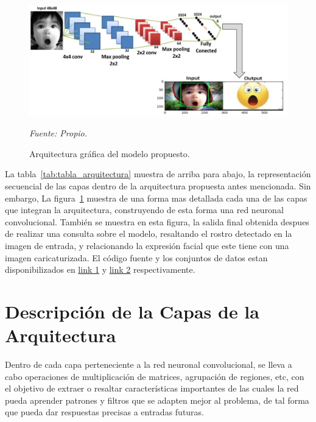 \begin{figure}[H]
		\centering
		\includegraphics[width=180mm]{Imagenes/arquitectura_CNN_grafico.pdf}
		\caption{Arquitectura gráfica del modelo propuesto.}
		\vspace{0.15cm}
		\textit{Fuente: Propio.}
		\label{fig:arquitectura_CNN_grafico}
\end{figure}

La tabla~\ref{tab:tabla_arquitectura} muestra de arriba para abajo, la representación secuencial de las capas dentro de la arquitectura propuesta antes mencionada. Sin embargo, La figura~\ref{fig:arquitectura_CNN_grafico} muestra de una forma mas detallada cada una de las capas que integran la arquitectura, construyendo de esta forma una red neuronal convolucional. También se muestra en esta figura, la salida final obtenida despues de realizar una consulta sobre el modelo, resaltando el rostro detectado en la imagen de entrada, y relacionando la expresión facial que este tiene con una imagen caricaturizada. El código fuente y los conjuntos de datos estan disponibilizados en
\href{https://github.com/darwinTC/Facial-Expression-Recognition/tree/master/report/Sources}{link 1} y \href{https://drive.google.com/drive/folders/1vMJIC8TW1NX7ffMbyZPraySLGV6hnGK7?usp=sharing}{link 2} respectivamente.

\section{Descripción de la Capas de la Arquitectura}

Dentro de cada capa perteneciente a la red neuronal convolucional, se lleva a cabo operaciones de multiplicación de matrices, agrupación de regiones, etc, con el objetivo de extraer o resaltar características importantes de las cuales la red pueda aprender patrones y filtros que se adapten mejor al problema, de tal forma que pueda dar respuestas precisas a entradas futuras. 

